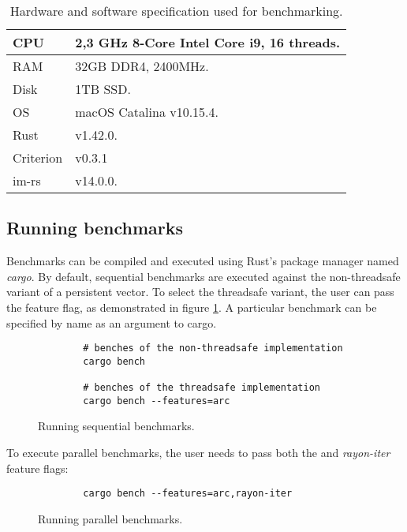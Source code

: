 \begin{table}[!htbp]
    \centering

    \begin{tabular} { |l| p{11cm} | }
        \hline CPU & 2,3 GHz 8-Core Intel Core i9, 16 threads. \\ \hline
        RAM & 32GB DDR4, 2400MHz. \\ \hline
        Disk & 1TB SSD. \\ \hline
        OS & macOS Catalina v10.15.4. \\ \hline
        Rust & v1.42.0. \\ \hline
        Criterion & v0.3.1 \\ \hline
        im-rs & v14.0.0. \\ \hline
    \end{tabular}

    \label{tab:exec-environment}
    \caption{Hardware and software specification used for benchmarking.}
\end{table}

\subsection{Running benchmarks}
Benchmarks can be compiled and executed using Rust's package manager named \emph{cargo}. By default, sequential benchmarks are executed against the non-threadsafe variant of a persistent vector. To select the threadsafe variant, the user can pass the \arc{} feature flag, as demonstrated in figure \ref{fig:sequential-benches}. A particular benchmark can be specified by name as an argument to cargo.

\begin{figure}[!htbp]
    \centering

    \begin{verbatim}
        # benches of the non-threadsafe implementation
        cargo bench

        # benches of the threadsafe implementation
        cargo bench --features=arc
    \end{verbatim}

    \caption{Running sequential benchmarks.}
    \label{fig:sequential-benches}
\end{figure}

To execute parallel benchmarks, the user needs to pass both the \arc{} and \emph{rayon-iter} feature flags:
\begin{figure}[!htbp]
    \centering

    \begin{verbatim}
        cargo bench --features=arc,rayon-iter
    \end{verbatim}

    \caption{Running parallel benchmarks.}
    \label{fig:parallel-benches}
\end{figure}

